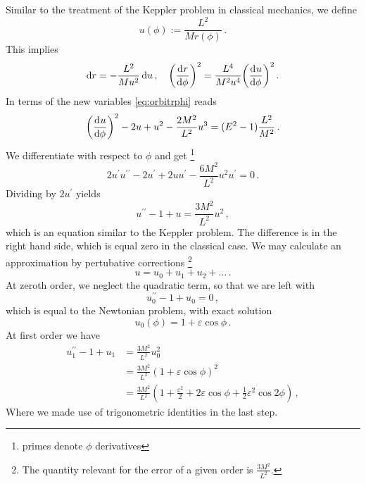 Similar to the treatment of the Keppler problem in classical mechanics, we
define
\begin{equation}
u(\phi):=\frac{L^2}{Mr(\phi)}\,.
\end{equation}
This implies
\begin{equation}
\dif r=-\frac{L^2}{Mu^2}\dif u\,,\quad
\left(\dod{r}{\phi}\right)^2=\frac{L^4}{M^2u^4}\left(\dod{u}{\phi}\right)^2\,.
\end{equation}
In terms of the new variables \eqref{eq:orbitrphi} reads
\begin{equation}
\left(\dod{u}{\phi}\right)^2-2u+u^2-\frac{2M^2}{L^2}u^3=(E^2-1)\frac{L^2}{M^2}\,.
\end{equation}
We differentiate with respect to $\phi$ and get 
\footnote{primes denote $\phi$
derivatives}
\begin{equation}
2u^\prime u^{\prime\prime}-2u^\prime+2u
u^{\prime}-\frac{6M^2}{L^2}u^2u^\prime=0\,.
\end{equation}
Dividing by $2u^\prime$ yields
\begin{equation}
u^{\prime\prime}-1+u=\frac{3M^2}{L^2}u^2\,,
\end{equation}
which is an equation similar to the Keppler problem. The difference is in the
right hand side, which is equal zero in the classical case.
We may calculate an approximation by pertubative corrections
\footnote{The quantity relevant for the error of a given order is
$\frac{3M^2}{L^2}$.}
\begin{equation}
u=u_0+u_1+u_2+\dots\,.
\end{equation}
At zeroth order, we neglect the quadratic term, so that we are left with
\begin{equation}
u_0^{\prime\prime}-1+u_0=0\,,
\end{equation}
which is equal to the Newtonian problem, with exact solution
\begin{equation}
u_0(\phi)=1+\varepsilon\cos\phi\,.
\end{equation}
At first order we have
\begin{equation}
\begin{split}
u_1^{\prime\prime}-1+u_1&=\frac{3M^2}{L^2}u_0^2\\
&=\frac{3M^2}{L^2}\left(1+\varepsilon\cos\phi\right)^2\\\
&=\frac{3M^2}{L^2}\left(1+\frac{\varepsilon^2}{2}+2\varepsilon\cos\phi+\frac{1}{2}\varepsilon^2\cos
2\phi\right)\,,
\end{split}
\end{equation}
Where we made use of trigonometric identities in the last step. 
